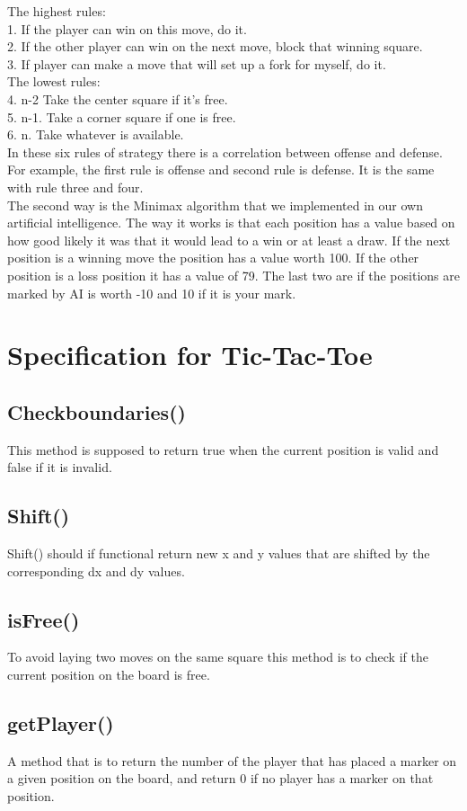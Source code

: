 \documentclass[a4paper,10pt]{article}
\begin{document}
	The highest rules:\\
	1. If the player can win on this move, do it. \\
	2. If the other player can win on the next move, block that winning square.\\
	3. If player can make a move that will set up a fork for myself, do it.\\
	The lowest rules:\\
	4. n-2 Take the center square if it’s free.\\
	5. n-1. Take a corner square if one is free. \\
	6. n. Take whatever is available.\\
	In these six rules of strategy there is a correlation between offense and defense. For example, the first rule is offense and second rule is defense. It is the same with rule three and four. \\
	The second way is the Minimax algorithm that we implemented in our own artificial intelligence. The way it works is that each position has a value based on how good likely it was that it would lead to a win or at least a draw. If the next position is a winning move the position has a value worth 100. If the other position is a loss position it has a value of 79. The last two are if the positions are marked by AI is worth -10 and 10 if it is your mark. \\
	
	
	\section{Specification for Tic-Tac-Toe} 
	\subsection{Checkboundaries()}
	This method is supposed to return true when the current position is valid and false if it is invalid.
	\subsection{Shift()}
	Shift() should if functional return new x and y values that are shifted by the corresponding dx and dy values.
	\subsection{isFree()}
	To avoid laying two moves on the same square this method is to check if the current position on the board is free.
	\subsection{getPlayer()}
	A method that is to return the number of the player that has placed a marker on a given position on the board, and return 0 if no player has a marker on that position.
\end{document}
